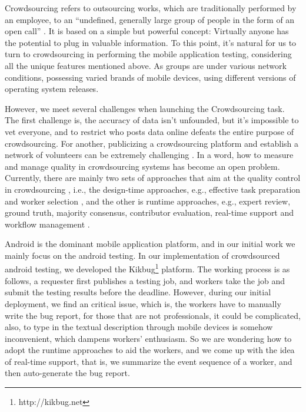\documentclass[10pt,conference]{IEEEtran}
\begin{document}
Crowdsourcing refers to outsourcing works, which are traditionally performed by an employee, to an ``undefined, generally large group
of people in the form of an open call'' \cite{vander2009crowdsourcing}. It is based on a simple but powerful concept:
Virtually anyone has the potential to plug in valuable information. To this point, it's natural for us to turn to crowdsourcing in performing
the mobile application testing, considering all the unique features mentioned above. As groups are under various network
conditions, possessing varied brands of mobile devices, using different versions of operating system releases. 

However, we meet several challenges when launching  the Crowdsourcing task. The first challenge is,
the accuracy of data isn't unfounded, but it's impossible to vet everyone, and to restrict who posts data online defeats
the entire purpose of crowdsourcing. For another, publicizing a crowdsourcing platform and establish a network of volunteers
can be extremely challenging \cite{greengard2011following}. In a word, how to measure and manage quality in crowdsourcing
systems has become an open problem. Currently, there are mainly two sets of approaches that aim at the quality control in crowdsourcing \cite{allahbakhsh2013quality},
i.e., the design-time approaches, e.g., effective task preparation and worker selection \cite{dow2012shepherding, kittur2008crowdsourcing, quinn2011human},
and the other is  runtime approaches, e.g., expert review, ground truth, majority consensus, contributor evaluation, real-time
support and workflow management \cite{dow2012shepherding, kittur2011crowdforge, kulkarni2012collaboratively}.

Android is the dominant mobile application platform, and in our initial work we mainly focus on the android testing.
In our implementation of crowdsourced android testing, we developed the Kikbug\footnote{http://kikbug.net} platform.
The working process is as follows, a requester first publishes a testing job, and workers take the job and submit the testing results before the
deadline. However, during our initial deployment, we find an critical issue, which is, the workers have to manually write the bug report,
for those that are not professionals, it could be complicated, also, to type in the textual description through mobile devices is somehow
inconvenient, which dampens workers' enthusiasm. So we are wondering how to adopt the runtime approaches to aid the workers,
and we come up with the idea of real-time support, that is, we summarize the event sequence of a worker, and then auto-generate the bug report.
\end{document}
